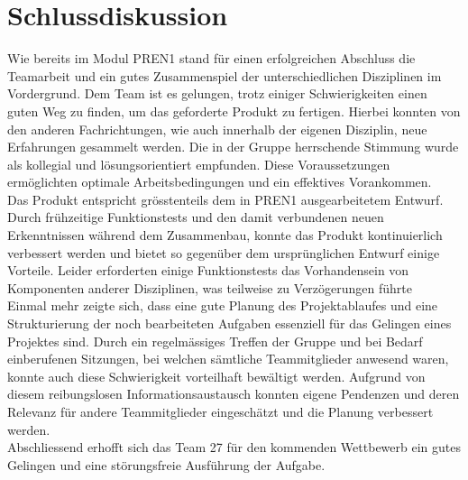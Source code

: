 \section{Schlussdiskussion}
Wie bereits im Modul PREN1 stand für einen erfolgreichen Abschluss die 
Teamarbeit und ein gutes Zusammenspiel der unterschiedlichen Disziplinen im 
Vordergrund. Dem Team ist es gelungen, trotz einiger Schwierigkeiten einen 
guten Weg zu finden, um das geforderte Produkt zu fertigen. Hierbei konnten 
von den anderen Fachrichtungen, wie auch innerhalb der eigenen Disziplin, neue 
Erfahrungen gesammelt werden. Die in der Gruppe herrschende Stimmung wurde als 
kollegial und lösungsorientiert empfunden. Diese Voraussetzungen ermöglichten 
optimale Arbeitsbedingungen und ein effektives Vorankommen.\\

\noindent
Das Produkt entspricht grösstenteils  dem in PREN1 ausgearbeitetem Entwurf. 
Durch frühzeitige Funktionstests und den damit verbundenen neuen Erkenntnissen 
während dem Zusammenbau, konnte das Produkt kontinuierlich verbessert werden 
und bietet so gegenüber dem ursprünglichen Entwurf einige Vorteile. Leider 
erforderten einige Funktionstests das Vorhandensein von Komponenten anderer 
Disziplinen, was teilweise zu Verzögerungen führte\\

\noindent
Einmal mehr zeigte sich, dass eine gute Planung des Projektablaufes und eine 
Strukturierung der noch bearbeiteten Aufgaben essenziell für das Gelingen 
eines Projektes sind. Durch ein regelmässiges Treffen der Gruppe und bei 
Bedarf einberufenen Sitzungen, bei welchen sämtliche Teammitglieder anwesend 
waren, konnte auch diese Schwierigkeit vorteilhaft bewältigt werden. Aufgrund 
von diesem reibungslosen Informationsaustausch konnten eigene Pendenzen und 
deren Relevanz für andere Teammitglieder eingeschätzt und die Planung 
verbessert werden.\\

\noindent
Abschliessend erhofft sich das Team 27 für den kommenden Wettbewerb ein gutes 
Gelingen und eine störungsfreie Ausführung der Aufgabe.\\
